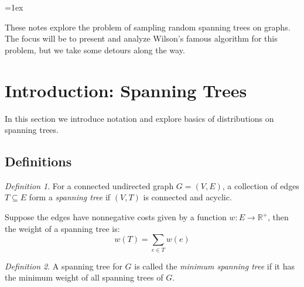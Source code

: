 \documentclass[11pt]{article}
\begin{document}
\newcommand\one{\textsf 1}
\newcommand\zero{\textsf 0}
\newcommand\cost{\mathcal C}
\newcommand\Lstar{$L^*$}

\theoremstyle{remark}
\newtheorem{alg}{Algorithm}

\newtheorem{theorem}{Theorem}
\newtheorem{defn}{Definition}
\newtheorem{prop}{Proposition}

\setlength\parindent{0in}
\addtolength\parskip{1ex}
\setlength\fboxrule{.5mm}\setlength{\fboxsep}{1.2mm}
\newlength\courseheader
\setlength\courseheader\textwidth
\addtolength\courseheader{-4mm}
\parindent=0pt
\parskip=1ex

\begin{center}
\end{center}
\medskip

These notes explore the problem of sampling random spanning trees on graphs. The
focus will be to present and analyze Wilson's famous algorithm for this problem,
but we take some detours along the way.

\section{Introduction: Spanning Trees}

In this section we introduce notation and explore basics of distributions on
spanning trees.

\subsection{Definitions}

\begin{defn}
For a connected undirected graph $G = (V, E)$, a collection of edges $T \subseteq E$
form a \emph{spanning tree} if $(V, T)$ is connected and acyclic.
\end{defn}

Suppose the edges have nonnegative costs given by a function $w\colon E \to
\mathbb{R^+}$, then the weight of a spanning tree is:
\[ w(T) = \sum_{e\in T} w(e) \]

\begin{defn}
A spanning tree for $G$ is called the \emph{minimum spanning tree} if it has the
minimum weight of all spanning trees of $G$.
\end{defn}
\end{document}
